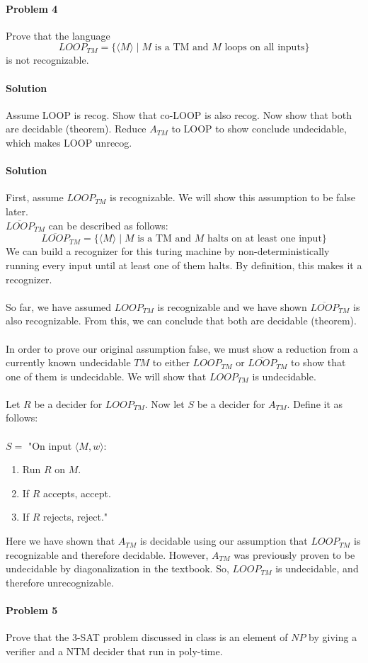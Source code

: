 \documentclass{article}
\begin{document}
\paragraph{Problem 4} Prove that the language
\[ LOOP_{TM} = \{ \langle M \rangle \;|\; M \text{ is a TM and $M$ loops on all inputs} \} \]
is not recognizable.
\\
\paragraph{Solution} Assume LOOP is recog. Show that co-LOOP is also recog. Now show that both are decidable (theorem). Reduce $A_{TM}$ to LOOP to show conclude undecidable, which makes LOOP unrecog.
\paragraph{Solution} First, assume $LOOP_{TM}$ is recognizable. We will show this assumption to be false later.
\\$\overline{LOOP}_{TM}$ can be described as follows:
\[\overline{ LOOP}_{TM} = \{ \langle M \rangle \;|\; M \text{ is a TM and $M$ halts on at least one input} \} \]
\noindent We can build a recognizer for this turing machine by non-deterministically running every input until at least one of them halts. By definition, this makes it a recognizer.
\\\\ So far, we have assumed $LOOP_{TM}$ is recognizable and we have shown $\overline{LOOP}_{TM}$ is also recognizable. From this, we can conclude that both are decidable (theorem). 
\\\\ In order to prove our original assumption false, we must show a reduction from a currently known undecidable $TM$ to either $LOOP_{TM}$ or $\overline{LOOP}_{TM}$ to show that one of them is undecidable. We will show that $LOOP_{TM}$ is undecidable.
\\\\ Let $R$ be a decider for $LOOP_{TM}$. Now let $S$ be a decider for $A_{TM}$. Define it as follows:
\\\\
\noindent $S = $ "On input $\langle M, w\rangle$: 
    \begin{enumerate}[\indent 1.]
    \item Run $R$ on $M$.
    \item If $R$ accepts, accept.
    \item If $R$ rejects, reject."
    \end{enumerate}
\noindent Here we have shown that $A_{TM}$ is decidable using our assumption that $LOOP_{TM}$ is recognizable and therefore decidable. However, $A_{TM}$ was previously proven to be undecidable by diagonalization in the textbook. So, $LOOP_{TM}$ is undecidable, and therefore unrecognizable. 

\paragraph{Problem 5} Prove that the 3-SAT problem discussed in class is an element of $NP$ by
giving a verifier and a NTM decider that run in poly-time.
\end{document}
